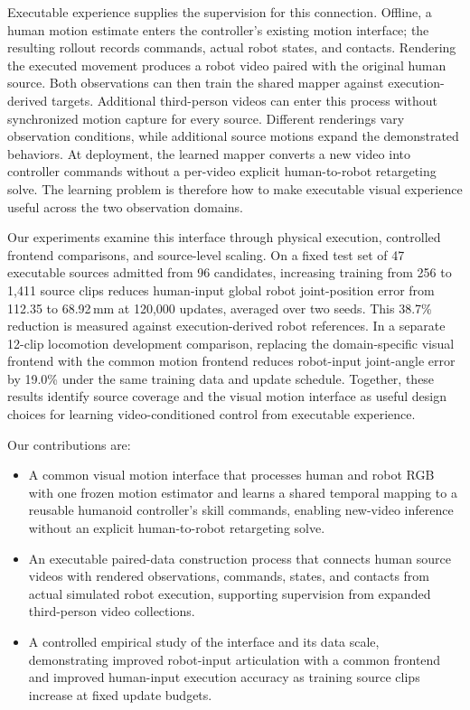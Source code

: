 Executable experience supplies the supervision for this connection. Offline, a human motion estimate enters the controller's existing motion interface; the resulting rollout records commands, actual robot states, and contacts. Rendering the executed movement produces a robot video paired with the original human source. Both observations can then train the shared mapper against execution-derived targets. Additional third-person videos can enter this process without synchronized motion capture for every source. Different renderings vary observation conditions, while additional source motions expand the demonstrated behaviors. At deployment, the learned mapper converts a new video into controller commands without a per-video explicit human-to-robot retargeting solve. The learning problem is therefore how to make executable visual experience useful across the two observation domains.

Our experiments examine this interface through physical execution, controlled frontend comparisons, and source-level scaling. On a fixed test set of 47 executable sources admitted from 96 candidates, increasing training from 256 to 1,411 source clips reduces human-input global robot joint-position error from 112.35 to 68.92\,mm at 120,000 updates, averaged over two seeds. This 38.7\% reduction is measured against execution-derived robot references. In a separate 12-clip locomotion development comparison, replacing the domain-specific visual frontend with the common motion frontend reduces robot-input joint-angle error by 19.0\% under the same training data and update schedule. Together, these results identify source coverage and the visual motion interface as useful design choices for learning video-conditioned control from executable experience.

Our contributions are:
\begin{itemize}
    \item A common visual motion interface that processes human and robot RGB with one frozen motion estimator and learns a shared temporal mapping to a reusable humanoid controller's skill commands, enabling new-video inference without an explicit human-to-robot retargeting solve.
    \item An executable paired-data construction process that connects human source videos with rendered observations, commands, states, and contacts from actual simulated robot execution, supporting supervision from expanded third-person video collections.
    \item A controlled empirical study of the interface and its data scale, demonstrating improved robot-input articulation with a common frontend and improved human-input execution accuracy as training source clips increase at fixed update budgets.
\end{itemize}

